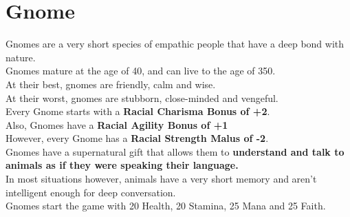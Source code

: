 \section{Gnome}\label{species:gnome}
Gnomes are a very short species of empathic people that have a deep bond with nature.\\
Gnomes mature at the age of 40, and can live to the age of 350.\\
At their best, gnomes are friendly, calm and wise.\\
At their worst, gnomes are stubborn, close-minded and vengeful.\\
Every Gnome starts with a \textbf{Racial Charisma Bonus of +2}.\\
Also, Gnomes have a \textbf{Racial Agility Bonus of +1}\\
However, every Gnome has a \textbf{Racial Strength Malus of -2}.\\
Gnomes have a supernatural gift that allows them to \textbf{understand and talk to animals as if they were speaking their language.}\\
In most situations however, animals have a very short memory and aren't intelligent enough for deep conversation.\\
Gnomes start the game with 20 Health, 20 Stamina, 25 Mana and 25 Faith.